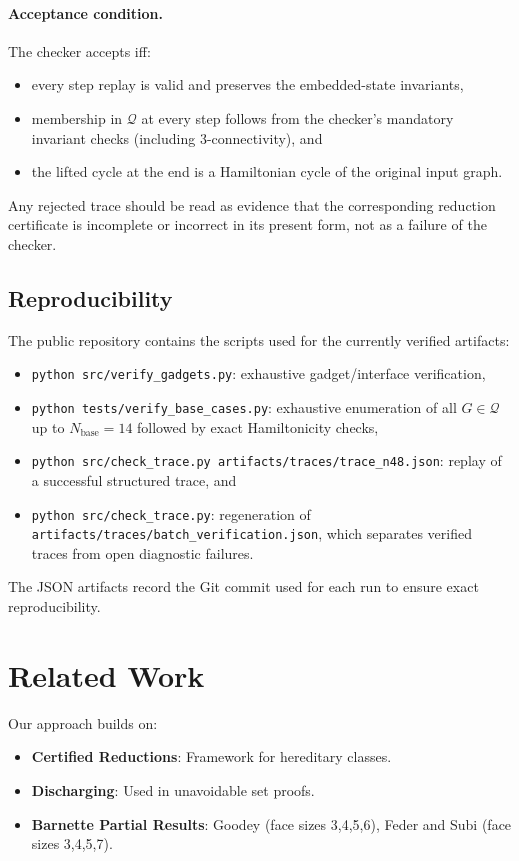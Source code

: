 \documentclass[12pt]{article}
\theoremstyle{definition}
\begin{document}
\paragraph{Acceptance condition.}
The checker accepts iff:
\begin{itemize}
\item every step replay is valid and preserves the embedded-state invariants,
\item membership in $\mathcal{Q}$ at every step follows from the checker’s mandatory invariant checks (including 3-connectivity), and
\item the lifted cycle at the end is a Hamiltonian cycle of the original input graph.
\end{itemize}

Any rejected trace should be read as evidence that the corresponding reduction certificate is incomplete or incorrect in its present form, not as a failure of the checker.

\subsection{Reproducibility}
The public repository contains the scripts used for the currently verified artifacts:
\begin{itemize}
  \item \texttt{python src/verify\_gadgets.py}: exhaustive gadget/interface verification,
  \item \texttt{python tests/verify\_base\_cases.py}: exhaustive enumeration of all $G\in\mathcal{Q}$ up to $N_{\text{base}}=14$ followed by exact Hamiltonicity checks,
  \item \texttt{python src/check\_trace.py artifacts/traces/trace\_n48.json}: replay of a successful structured trace, and
  \item \texttt{python src/check\_trace.py}: regeneration of \texttt{artifacts/traces/batch\_verification.json}, which separates verified traces from open diagnostic failures.
\end{itemize}
The JSON artifacts record the Git commit used for each run to ensure exact reproducibility.

\section{Related Work}
\label{sec:related}

Our approach builds on:
\begin{itemize}
    \item \textbf{Certified Reductions}: Framework for hereditary classes.
    \item \textbf{Discharging}: Used in unavoidable set proofs.
    \item \textbf{Barnette Partial Results}: Goodey (face sizes 3,4,5,6), 
          Feder and Subi (face sizes 3,4,5,7).
\end{itemize}
\end{document}
